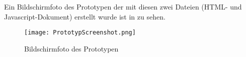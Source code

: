 Ein Bildschirmfoto des Prototypen der mit diesen zwei Dateien (HTML- und Javascript-Dokument) erstellt wurde ist in  zu sehen.

\begin{figure}[htb]
\centering
\texttt{[image: PrototypScreenshot.png]}
\caption[PrototypScreenshot]{Bildschirmfoto des Prototypen}
\label{fig:PrototypScreenshot}
\end{figure}